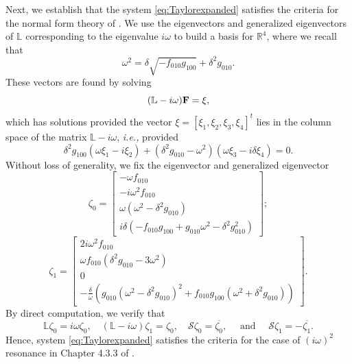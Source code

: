 \documentclass[11pt]{article}
\numberwithin{equation}{section}
\begin{document}
Next, we establish that the system \eqref{eq:Taylorexpanded} satisfies the criteria for the normal form theory of \cite{HI2011}. 
We use the eigenvectors and generalized eigenvectors of $\mathbb L$ corresponding to the eigenvalue $i \omega$ to build a basis for $\mathbb{R}^4$, where we recall that
\begin{equation}\label{eq:omega}
\omega^2 = \delta \sqrt{-f_{010} g_{100}} + \delta^2 g_{010}.
\end{equation}
These vectors are found by solving 
\begin{equation}
(\mathbb{L} - i \omega) {\bf F} = \xi,
\end{equation}
which has solutions provided the vector
$\xi = [\xi_1,\xi_2,\xi_3,\xi_4]^t$ lies in the column space of the matrix $\mathbb{L} - i \omega$, {\it i.e.,} provided 
\begin{equation}
\delta^2 g_{100} ( \omega \xi_1 - i \xi_2 )+(\delta^2 g_{010} - \omega^2)(\omega \xi_3 - i \delta \xi_4) = 0.
\end{equation}
Without loss of generality, we fix the eigenvector  and generalized eigenvector
\begin{equation}
\zeta_0 = \left[ \begin{array}{c}
-\omega f_{010} \\
-i \omega^2 f_{010}\\
\omega ( \omega^2- \delta^2 g_{010})\\
i \delta ( -f_{010} g_{100 } + g_{010} \omega^2-\delta^2 g_{010}^2)
\end{array}
\right];
\end{equation} 
\begin{equation}
\zeta_1 =
\left[
\begin{array}{c}
2 i \omega^2 f_{010} \\
\omega f_{010} (\delta^2 g_{010} - 3 \omega^2) \\
0 \\
-\frac{\delta}{\omega} ( g_{010}(\omega^2-\delta^2 g_{010})^2 + f_{010} g_{100} ( \omega^2+\delta^2 g_{010}))
\end{array}
\right].
\end{equation}
By direct computation, we verify that 
%
\[ \mathbb L \zeta_0 = i \omega \zeta_0, \quad (\mathbb L - i \omega) \zeta_1 = \zeta_0, \quad \mathcal{S} \zeta_0 = \overline{\zeta_0}, \quad \text{ and } \quad \mathcal{S} \zeta_1 = - \overline{\zeta_1}. \]
%
Hence, system \eqref{eq:Taylorexpanded} satisfies the criteria for the case of $(i\omega)^2$ resonance in Chapter 4.3.3 of \cite{HI2011}. 
\end{document}
